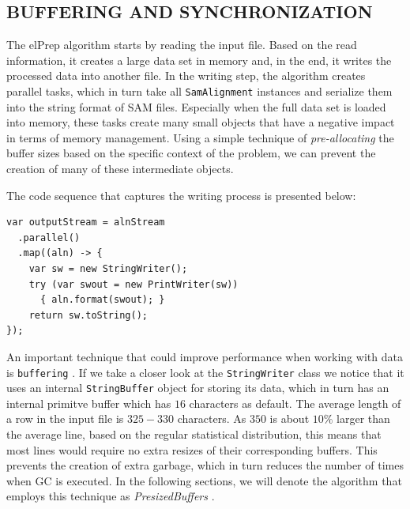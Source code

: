\documentclass[a4paper,twoside]{article}
\begin{document}
\subsection{\uppercase{Buffering and Synchronization}}
\label{subsec:buffering}

The elPrep algorithm starts by reading the input file. 
Based on the read information, it creates a large data set in memory and, in the end, it writes the processed data into another file.
In the writing step, the algorithm creates parallel tasks, which in turn take all \texttt{SamAlignment} instances and serialize them into the string format of SAM files.
Especially when the full data set is loaded into memory, these tasks create many small objects that have a negative impact in terms of memory management. Using a simple technique of {\textit{pre-allocating} } the buffer sizes based on the specific context of the problem, we can prevent the creation of many of these intermediate objects.

The code sequence that captures the writing process is presented below:
\begin{verbatim}
var outputStream = alnStream
  .parallel()
  .map((aln) -> {
    var sw = new StringWriter();
    try (var swout = new PrintWriter(sw))
      { aln.format(swout); }
    return sw.toString();
});
\end{verbatim}

An important technique that could improve performance when working with data is {\texttt{buffering}} \cite{oaks:2014}.
If we take a closer look at the {\texttt{StringWriter}} class we notice that it uses an internal {\texttt{StringBuffer}} object for storing its data, which in turn has an internal primitve buffer   which has $16$ characters as default.
The average length of a row in the input file is $325 - 330$ characters.
As $350$ is about $10\%$ larger than the average line, based on the regular statistical distribution, this means that most lines would require no extra resizes of their corresponding buffers. This prevents the creation of extra garbage, which in turn reduces the number of times when GC is executed.
In the following sections, we will denote the algorithm that employs this technique as {\textit{PresizedBuffers} }.
\end{document}

